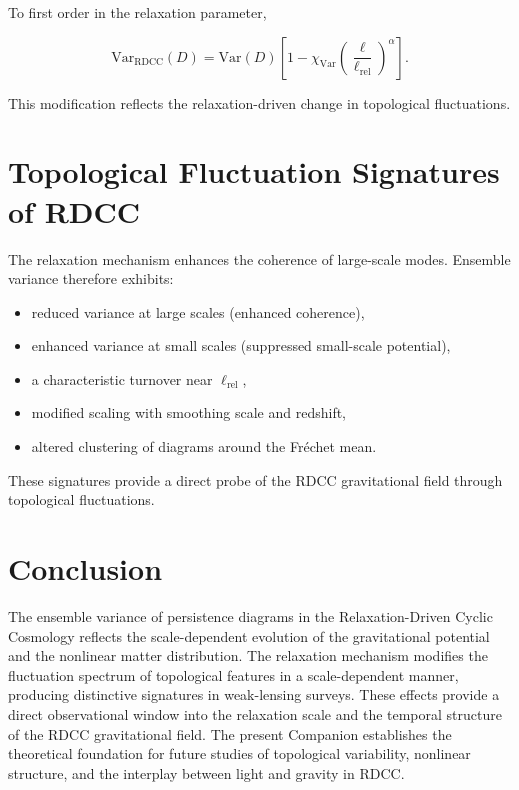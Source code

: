 \documentclass[11pt,a4paper]{article}
\begin{document}
To first order in the relaxation parameter,

\begin{equation}
    \mathrm{Var}_{\mathrm{RDCC}}(D)
    = \mathrm{Var}(D)
      \left[
        1 - \chi_{\mathrm{Var}}
        \left(\frac{\ell}{\ell_{\mathrm{rel}}}\right)^{\alpha}
      \right].
\end{equation}

This modification reflects the relaxation-driven change in topological 
fluctuations.
\section{Topological Fluctuation Signatures of RDCC}

The relaxation mechanism enhances the coherence of large-scale modes. Ensemble 
variance therefore exhibits:

\begin{itemize}
    \item reduced variance at large scales (enhanced coherence),
    \item enhanced variance at small scales (suppressed small-scale potential),
    \item a characteristic turnover near $\ell_{\mathrm{rel}}$,
    \item modified scaling with smoothing scale and redshift,
    \item altered clustering of diagrams around the Fréchet mean.
\end{itemize}

These signatures provide a direct probe of the RDCC gravitational field through 
topological fluctuations.
\section{Conclusion}

The ensemble variance of persistence diagrams in the Relaxation-Driven Cyclic 
Cosmology reflects the scale-dependent evolution of the gravitational potential and 
the nonlinear matter distribution. The relaxation mechanism modifies the 
fluctuation spectrum of topological features in a scale-dependent manner, 
producing distinctive signatures in weak-lensing surveys. These effects provide a 
direct observational window into the relaxation scale and the temporal structure of 
the RDCC gravitational field. The present Companion establishes the theoretical 
foundation for future studies of topological variability, nonlinear structure, and 
the interplay between light and gravity in RDCC.


\nocite{*}

\end{document}

